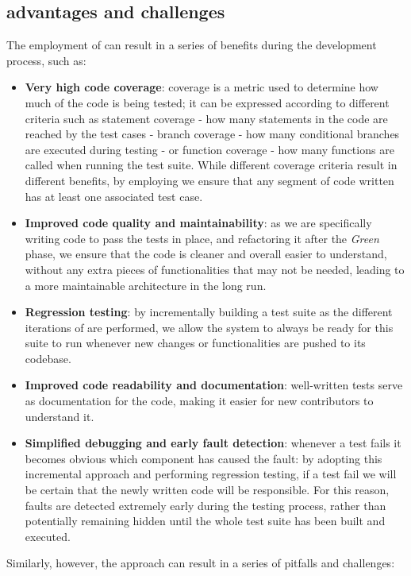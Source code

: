 \subsection{\tdd advantages and challenges}
The employment of \tdd can result in a series of benefits during the development process, such as:
\begin{itemize}
    \item \textbf{Very high code coverage}: coverage is a metric used to determine how much of the code is being tested; it can be expressed according to different criteria such as statement coverage - \ie how many statements in the code are reached by the test cases - branch coverage - \ie how many conditional branches are executed during testing - or function coverage - \ie how many functions are called when running the test suite. While different coverage criteria result in different benefits, by employing \tdd we ensure that any segment of code written has at least one associated test case.
    \item \textbf{Improved code quality and maintainability}: as we are specifically writing code to pass the tests in place, and refactoring it after the \textit{Green} phase, we ensure that the code is cleaner and overall easier to understand, without any extra pieces of functionalities that may not be needed, leading to a more maintainable architecture in the long run.
    \item \textbf{Regression testing}: by incrementally building a test suite as the different iterations of \tdd are performed, we allow the system to always be ready for this suite to run whenever new changes or functionalities are pushed to its codebase.
    \item \textbf{Improved code readability and documentation}: well-written tests serve as documentation for the code, making it easier for new contributors to understand it.
    \item \textbf{Simplified debugging and early fault detection}: whenever a test fails it becomes obvious which component has caused the fault: by adopting this incremental approach and performing regression testing, if a test fail we will be certain that the newly written code will be responsible. For this reason, faults are detected extremely early during the testing process, rather than potentially remaining hidden until the whole test suite has been built and executed.
\end{itemize}
Similarly, however, the \tdd approach can result in a series of pitfalls and challenges:
